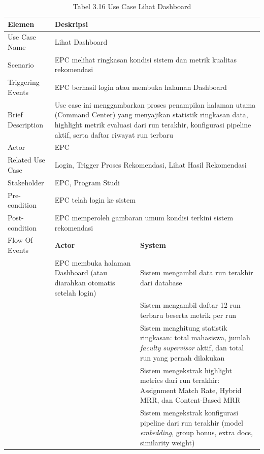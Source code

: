 \begin{longtable}{|p{3.5cm}|p{4.5cm}|p{5cm}|}
\caption{Tabel 3.16 Use Case Lihat Dashboard} \label{table:tab3.16} \\
\hline
\textbf{Elemen} & \multicolumn{2}{p{\ucdeskcol}|}{\textbf{Deskripsi}} \\
\hline
\endfirsthead
\endhead
\hline
\endfoot
Use Case Name & \multicolumn{2}{p{\ucdeskcol}|}{Lihat Dashboard} \\
\hline
Scenario & \multicolumn{2}{p{\ucdeskcol}|}{EPC melihat ringkasan kondisi sistem dan metrik kualitas rekomendasi} \\
\hline
Triggering Events & \multicolumn{2}{p{\ucdeskcol}|}{EPC berhasil login atau membuka halaman Dashboard} \\
\hline
Brief Description & \multicolumn{2}{p{\ucdeskcol}|}{Use case ini menggambarkan proses penampilan halaman utama (Command Center) yang menyajikan statistik ringkasan data, highlight metrik evaluasi dari run terakhir, konfigurasi pipeline aktif, serta daftar riwayat run terbaru} \\
\hline
Actor & \multicolumn{2}{p{\ucdeskcol}|}{EPC} \\
\hline
Related Use Case & \multicolumn{2}{p{\ucdeskcol}|}{Login, Trigger Proses Rekomendasi, Lihat Hasil Rekomendasi} \\
\hline
Stakeholder & \multicolumn{2}{p{\ucdeskcol}|}{EPC, Program Studi} \\
\hline
Pre-condition & \multicolumn{2}{p{\ucdeskcol}|}{EPC telah login ke sistem} \\
\hline
Post-condition & \multicolumn{2}{p{\ucdeskcol}|}{EPC memperoleh gambaran umum kondisi terkini sistem rekomendasi} \\
\hline
Flow Of Events & \textbf{Actor} & \textbf{System} \\
\hline
 & EPC membuka halaman Dashboard (atau diarahkan otomatis setelah login) & Sistem mengambil data run terakhir dari database \\
\hline
 & & Sistem mengambil daftar 12 run terbaru beserta metrik per run \\
\hline
 & & Sistem menghitung statistik ringkasan: total mahasiswa, jumlah \textit{faculty supervisor} aktif, dan total run yang pernah dilakukan \\
\hline
 & & Sistem mengekstrak highlight metrics dari run terakhir: Assignment Match Rate, Hybrid MRR, dan Content-Based MRR \\
\hline
 & & Sistem mengekstrak konfigurasi pipeline dari run terakhir (model \textit{embedding}, group bonus, extra docs, similarity weight) \\

\end{longtable}
